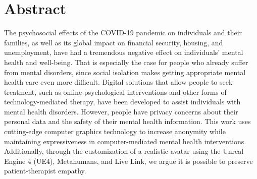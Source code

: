 \chapter*{Abstract}
\justify
The psychosocial effects of the COVID-19 pandemic on individuals and their families, as well as its global impact on financial security, housing, and unemployment, have had a tremendous negative effect on individuals’ mental health and well-being. That is especially the case for people who already suffer from mental disorders, since social isolation makes getting appropriate mental health care even more difficult.
Digital solutions that allow people to seek treatment, such as online psychological interventions and other forms of technology-mediated therapy, have been developed to assist individuals with mental health disorders. However, people have privacy concerns about their personal data and the safety of their mental health information. This work uses cutting-edge computer graphics technology to increase anonymity while maintaining expressiveness in computer-mediated mental health interventions. Additionally, through the customization of a realistic avatar using the Unreal Engine 4 (UE4), Metahumans, and Live Link, we argue it is possible to preserve patient-therapist empathy.

